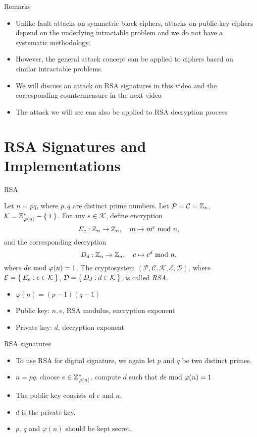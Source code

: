 \begin{frame}{Remarks}
    \begin{itemize}
        \item Unlike fault attacks on symmetric block ciphers, attacks on public key ciphers depend on the underlying intractable problem and we do not have a systematic methodology.
        \item However, the general attack concept can be applied to ciphers based on similar intractable problems.
        \item We will discuss an attack on RSA signatures in this video and the corresponding countermeasure in the next video
        \item The attack we will see can also be applied to RSA decryption process
    \end{itemize}
\end{frame}

\section{RSA Signatures and Implementations}
\begin{frame}{\VideoName}
    \tableofcontents[currentsection]
\end{frame}

\begin{frame}{RSA}
\begin{definition}[RSA]
Let $n=pq$, where $p,q$ are distinct prime numbers.
Let $\mathcal{P}=\mathcal{C}={\mathbb Z}_n$, $\mathcal{K}={\mathbb Z}_{\varphi(n)}^*-\Set{1}$.
For any $e\in \mathcal{K}$, define encryption
\[
    E_e:{\mathbb Z}_n\to{\mathbb Z}_n,\quad m\mapsto m^e\textrm{~mod~} n,
\]
and the corresponding decryption
\[
    D_d:{\mathbb Z}_n\to{\mathbb Z}_n,\quad c\mapsto c^d\textrm{~mod~} n,
\]
where $de\textrm{~mod~}\varphi(n)=1$.
The cryptosystem $(\mathcal{P},\mathcal{C},\mathcal{K},\mathcal{E},\mathcal{D})$, where $\mathcal{E}=\Set{E_e:e\in\mathcal{K}}$, $\mathcal{D}=\Set{D_d:d\in\mathcal{K}}$, is called \textit{RSA}.
\end{definition}
\begin{itemize}
    \item $\varphi(n)=(p-1)(q-1)$
    \item Public key: $n,e$, RSA modulus, encryption exponent
    \item Private key: $d$, decryption exponent
\end{itemize}
\end{frame}

\begin{frame}{RSA signatures}
    \begin{itemize}
        \item To use RSA for digital signature, we again let $p$ and $q$ be two distinct primes.
        \item $n=pq$, choose $e\in{\mathbb Z}_{\varphi(n)}^*$, compute $d$ such that $de\textrm{~mod~}\varphi(n)=1$
        \item The public key consists of $e$ and $n$.
        \item $d$ is the private key.
        \item $p$, $q$ and $\varphi(n)$ should be kept secret.
    \end{itemize}
\end{frame}

